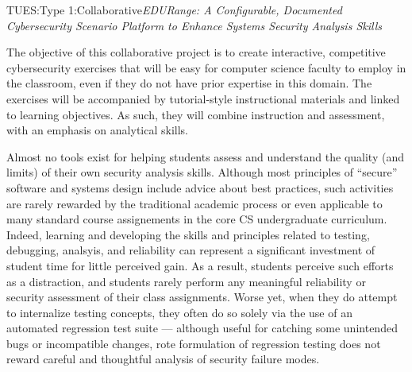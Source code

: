 \documentclass[11pt]{report}
\begin{document}
\begin{center} 
{\Large TUES:Type 1:Collaborative{\em EDURange: A Configurable,
    Documented Cybersecurity Scenario Platform to Enhance Systems
    Security Analysis Skills}}
\end{center}

The objective of this collaborative project is to create interactive, competitive 
cybersecurity exercises that will be easy for computer science faculty to employ in the 
classroom, even if they do not have prior expertise in this domain.  The exercises 
will be accompanied by tutorial-style instructional materials and linked to learning objectives. 
As such, they will combine instruction and assessment, with an emphasis on
analytical skills.

Almost no tools exist for helping students assess and
understand the quality (and limits) of their own security analysis
skills.  Although most principles of ``secure'' software and systems
design include advice about best practices, such activities are rarely
rewarded by the traditional academic process or even applicable to
many standard course assignements in the core CS undergraduate
curriculum.  Indeed, learning and developing the skills and principles
related to testing, debugging, analsyis, and reliability can represent
a significant investment of student time for little perceived gain. As
a result, students perceive such efforts as a distraction, and
students rarely perform any meaningful reliability or security
assessment of their class assignments.  Worse yet, when they do
attempt to internalize testing concepts, they often do so solely via
the use of an automated regression test suite --- although useful for
catching some unintended bugs or incompatible changes, rote
formulation of regression testing does not reward careful and
thoughtful analysis of security failure modes.
\end{document}
